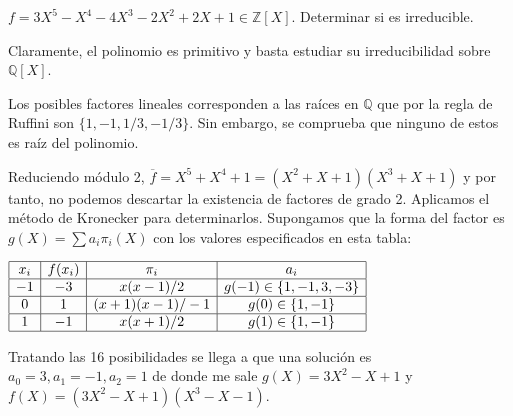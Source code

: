 \begin{example}
$f = 3X^5 - X^4 - 4X^3 - 2X^2 + 2X + 1 \in \mathbb{Z}[X]$. Determinar si es irreducible. 

Claramente, el polinomio es primitivo y basta estudiar su irreducibilidad sobre $\mathbb{Q}[X]$. 

Los posibles factores lineales corresponden a las raíces en $\mathbb{Q}$ que por la regla de Ruffini son $\{1,-1,1/3,-1/3\}$. Sin embargo, se comprueba que ninguno de estos es raíz del polinomio.

Reduciendo módulo 2, $\overline{f} = X^5+X^4+1 = (X^2+X+1)(X^3+X+1)$ y por tanto, no podemos descartar la existencia de factores de grado 2. Aplicamos el método de Kronecker para determinarlos. Supongamos que la forma del factor es $g(X) = \sum a_i \pi_i(X)$ con los valores especificados en esta tabla: 

$\begin{array}{|c|c|c|c|} \hline 
x_i & f(x_i) & \pi_i     & a_i  \\ \hline 
-1  & -3 & x(x-1)/2      & g(-1) \in \{1,-1,3,-3\} \\ \hline 
0   & 1  & (x+1)(x-1)/-1 & g(0) \in \{1,-1 \} \\ \hline 
1   & -1 & x(x+1)/2      & g(1) \in \{1,-1 \} \\ \hline 
\end{array}$

Tratando las 16 posibilidades se llega a que una solución es $a_0 = 3, a_1 = -1, a_2 = 1$ de donde me sale $g(X) = 3X^2-X+1$ y $f(X) = (3X^2-X+1)(X^3-X-1)$.
\end{example}

